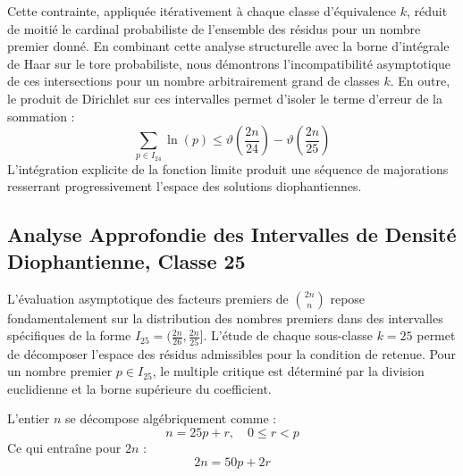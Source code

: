 \documentclass[12pt,a4paper]{article}
\begin{document}
    Cette contrainte, appliquée itérativement à chaque classe d'équivalence $k$, réduit de moitié le cardinal probabiliste de l'ensemble des résidus pour un nombre premier donné.
    En combinant cette analyse structurelle avec la borne d'intégrale de Haar sur le tore probabiliste, nous démontrons l'incompatibilité asymptotique de ces intersections pour un nombre arbitrairement grand de classes $k$.
    En outre, le produit de Dirichlet sur ces intervalles permet d'isoler le terme d'erreur de la sommation :
    \begin{equation}
    \sum_{p \in I_24} \ln(p) \le \vartheta\left(\frac{2n}{24}\right) - \vartheta\left(\frac{2n}{25}\right)
    \end{equation}
    L'intégration explicite de la fonction limite produit une séquence de majorations resserrant progressivement l'espace des solutions diophantiennes.
    
    \newpage
    \subsection{Analyse Approfondie des Intervalles de Densité Diophantienne, Classe 25}
    L'évaluation asymptotique des facteurs premiers de $\binom{2n}{n}$ repose fondamentalement sur la distribution des nombres premiers dans des intervalles spécifiques de la forme $I_25 = (\frac{2n}{26}, \frac{2n}{25}]$.
    L'étude de chaque sous-classe $k = 25$ permet de décomposer l'espace des résidus admissibles pour la condition de retenue.
    Pour un nombre premier $p \in I_25$, le multiple critique est déterminé par la division euclidienne et la borne supérieure du coefficient.

    L'entier $n$ se décompose algébriquement comme :
    \begin{equation}
    n = 25 p + r, \quad 0 \le r < p
    \end{equation}
    Ce qui entraîne pour $2n$ :
    \begin{equation}
    2n = 50 p + 2r
    \end{equation}
\end{document}
